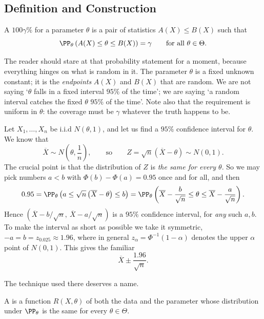 \subsection{Definition and Construction}

\begin{definition}
  A $100\gamma\%$  for a parameter $\theta$ is a pair of statistics $A(X) \leq B(X)$ such that
  $$
  \PP_\theta\left(A(X) \leq \theta \leq B(X)\right) = \gamma \qquad \text{for all } \theta \in \Theta.
  $$
\end{definition}

The reader should stare at that probability statement for a moment, because everything hinges on what is random in it. The parameter $\theta$ is a fixed unknown constant; it is the \emph{endpoints} $A(X)$ and $B(X)$ that are random. We are not saying `$\theta$ falls in a fixed interval $95\%$ of the time'; we are saying `a random interval catches the fixed $\theta$ $95\%$ of the time'. Note also that the requirement is uniform in $\theta$: the coverage must be $\gamma$ whatever the truth happens to be.

\begin{example}
  Let $X_1, \dots, X_n$ be i.i.d $N(\theta, 1)$, and let us find a $95\%$ confidence interval for $\theta$. We know that
  $$
  \overline{X} \sim N\left(\theta, \frac{1}{n}\right), \qquad \text{so} \qquad Z = \sqrt{n}\left(\overline{X} - \theta\right) \sim N(0,1).
  $$
  The crucial point is that the distribution of $Z$ is \emph{the same for every $\theta$}. So we may pick numbers $a < b$ with $\Phi(b) - \Phi(a) = 0.95$ once and for all, and then
  $$
  0.95 = \PP_\theta\left(a \leq \sqrt{n}\left(\overline{X} - \theta\right) \leq b\right) = \PP_\theta\left(\overline{X} - \frac{b}{\sqrt{n}} \leq \theta \leq \overline{X} - \frac{a}{\sqrt{n}}\right).
  $$
  Hence $\left(\overline{X} - b/\sqrt{n},\ \overline{X} - a/\sqrt{n}\right)$ is a $95\%$ confidence interval, for \emph{any} such $a,b$. To make the interval as short as possible we take it symmetric, $-a = b = z_{0.025} \approx 1.96$, where in general $z_\alpha = \Phi^{-1}(1-\alpha)$ denotes the upper $\alpha$ point of $N(0,1)$. This gives the familiar
  $$
  \overline{X} \pm \frac{1.96}{\sqrt{n}}.
  $$
\end{example}

The technique used there deserves a name.

\begin{definition}[Pivot]
  A  is a function $R(X, \theta)$ of both the data and the parameter whose distribution under $\PP_\theta$ is the same for every $\theta \in \Theta$.
\end{definition}


